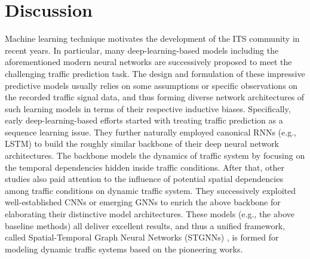 \section{Discussion}
Machine learning technique motivates the development of the ITS community in recent years. In particular, many deep-learning-based models including the aforementioned modern neural networks are successively proposed to meet the challenging traffic prediction task. The design and formulation of these impressive predictive models usually relies on some assumptions or specific observations on the recorded traffic signal data, and thus forming diverse network architectures of such learning models in terms of their respective inductive biases. Specifically, early deep-learning-based efforts started with treating traffic prediction as a sequence learning issue. They further naturally employed canonical RNNs (e.g., LSTM) to build the roughly similar backbone of their deep neural network architectures. The backbone models the dynamics of traffic system by focusing on the temporal dependencies hidden inside traffic conditions. After that, other studies also paid attention to the influence of potential spatial dependencies among traffic conditions on dynamic traffic system. They successively exploited well-established CNNs or emerging GNNs to enrich the above backbone for elaborating their distinctive model architectures. These models (e.g., the above baseline methods) all deliver excellent results, and thus a unified framework, called Spatial-Temporal Graph Neural Networks (STGNNs) \cite{2019A}, is formed for modeling dynamic traffic systems based on the pioneering works.

